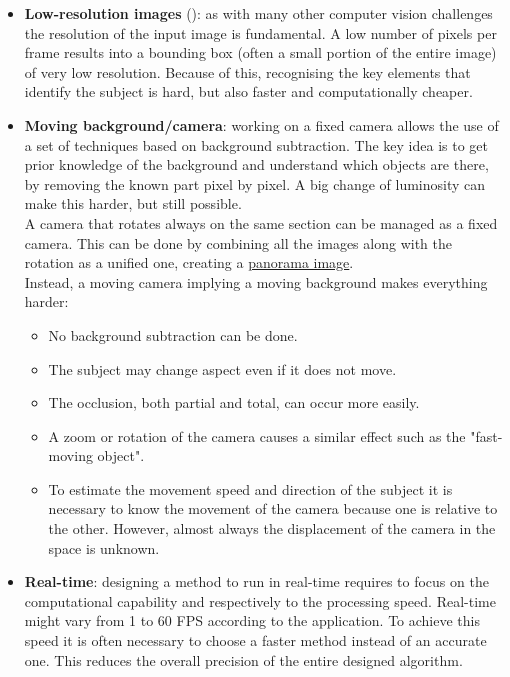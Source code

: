 \begin{itemize}
	\item \textbf{Low-resolution images} (): as with many other computer vision challenges the resolution of the input image is fundamental. A low number of pixels per frame results into a bounding box (often a small portion of the entire image) of very low resolution. Because of this, recognising the key elements that identify the subject is hard, but also faster and computationally cheaper.

	\item \textbf{Moving background/camera}: working on a fixed camera allows the use of a set of techniques based on background subtraction. The key idea is to get prior knowledge of the background and understand which objects are there, by removing the known part pixel by pixel. A big change of luminosity can make this harder, but still possible.\\
	A camera that rotates always on the same section can be managed as a fixed camera. This can be done by combining all the images along with the rotation as a unified one, creating a \underline{panorama image}.\\
	Instead, a moving camera implying a moving background makes everything harder:
	\begin{itemize}
		\item No background subtraction can be done.
		\item The subject may change aspect even if it does not move.
		\item The occlusion, both partial and total, can occur more easily.
		\item A zoom or rotation of the camera causes a similar effect such as the "fast-moving object".
		\item To estimate the movement speed and direction of the subject it is necessary to know the movement of the camera because one is relative to the other. However, almost always the displacement of the camera in the space is unknown.
	\end{itemize}

	\item \textbf{Real-time}: designing a method to run in real-time requires to focus on the computational capability and respectively to the processing speed. Real-time might vary from 1 to 60 FPS according to the application. To achieve this speed it is often necessary to choose a faster method instead of an accurate one. This reduces the overall precision of the entire designed algorithm.\\


\end{itemize}
